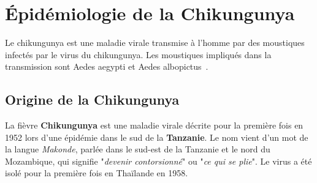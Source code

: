 \chapter{Épidémiologie de la Chikungunya}
Le chikungunya est une maladie virale transmise à l'homme par des moustiques infectés par le virus du chikungunya. Les moustiques impliqués dans la transmission sont Aedes aegypti et Aedes albopictus~\cite{intro}.
\section{Origine de la Chikungunya}
La fièvre \textbf{Chikungunya} est une maladie virale décrite pour la première fois en 1952 lors d'une épidémie dans le sud de la \textbf{Tanzanie}. Le nom vient d'un mot de la langue \textit{Makonde}, parlée dans le sud-est de la Tanzanie et le nord du Mozambique, qui signifie "\textit{devenir contorsionné}" ou "\textit{ce qui se plie}". Le virus a été isolé pour la première fois en Thaïlande en 1958.\cite{origin}

